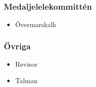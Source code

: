 \documentclass{dsekprotokoll}
\begin{document}
\begin{multicols}{2}
  \subsubsection*{Medaljelelekommittén}
  \begin{itemize}
    \item Övermarskalk
  \end{itemize}
  
  \subsubsection*{Övriga}
  \begin{itemize}
    \item Revisor
    \item Talman
  \end{itemize}

\end{multicols}
\end{document}
